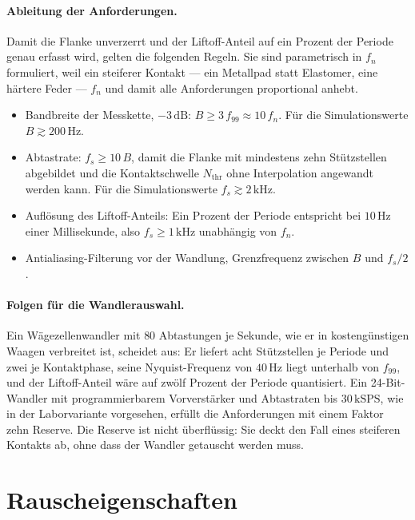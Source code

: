 \documentclass[12pt,a4paper]{report}
\begin{document}
\paragraph{Ableitung der Anforderungen.}
Damit die Flanke unverzerrt und der Liftoff-Anteil auf ein Prozent der
Periode genau erfasst wird, gelten die folgenden Regeln. Sie sind
parametrisch in $f_n$ formuliert, weil ein steiferer Kontakt --- ein
Metallpad statt Elastomer, eine härtere Feder --- $f_n$ und damit alle
Anforderungen proportional anhebt.

\begin{itemize}
\item Bandbreite der Messkette, $-3\,\mathrm{dB}$:
      $B \geq 3\,f_{99} \approx 10\,f_n$. Für die Simulationswerte
      $B \gtrsim 200\,\mathrm{Hz}$.
\item Abtastrate: $f_s \geq 10\,B$, damit die Flanke mit mindestens zehn
      Stützstellen abgebildet und die Kontaktschwelle $N_{\mathrm{thr}}$
      ohne Interpolation angewandt werden kann. Für die Simulationswerte
      $f_s \gtrsim 2\,\mathrm{kHz}$.
\item Auflösung des Liftoff-Anteils: Ein Prozent der Periode entspricht
      bei $10\,\mathrm{Hz}$ einer Millisekunde, also $f_s \geq 1\,\mathrm{kHz}$
      unabhängig von $f_n$.
\item Antialiasing-Filterung vor der Wandlung, Grenzfrequenz zwischen
      $B$ und $f_s/2$.
\end{itemize}

\paragraph{Folgen für die Wandlerauswahl.}
Ein Wägezellenwandler mit $80$ Abtastungen je Sekunde, wie er in
kostengünstigen Waagen verbreitet ist, scheidet aus: Er liefert acht
Stützstellen je Periode und zwei je Kontaktphase, seine Nyquist-Frequenz
von $40\,\mathrm{Hz}$ liegt unterhalb von $f_{99}$, und der
Liftoff-Anteil wäre auf zwölf Prozent der Periode quantisiert. Ein
24-Bit-Wandler mit programmierbarem Vorverstärker und Abtastraten bis
$30\,\mathrm{kSPS}$, wie in der Laborvariante vorgesehen, erfüllt die
Anforderungen mit einem Faktor zehn Reserve. Die Reserve ist nicht
überflüssig: Sie deckt den Fall eines steiferen Kontakts ab, ohne dass
der Wandler getauscht werden muss.

\section{Rauscheigenschaften}
\end{document}
